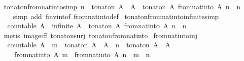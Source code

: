 \begin{isabellebody}
\endisatagproof
{\isafoldproof}%
%
\isadelimproof
\isanewline
%
\endisadelimproof
\isanewline
{}\isamarkupfalse%
\ to{\isacharunderscore}nat{\isacharunderscore}on{\isacharunderscore}from{\isacharunderscore}nat{\isacharunderscore}into{\isacharbrackleft}simp{\isacharbrackright}{\isacharcolon}\ {\isachardoublequoteopen}n\ {\isasymin}\ to{\isacharunderscore}nat{\isacharunderscore}on\ A\ {\isacharbackquote}\ A\ {\isasymLongrightarrow}\ to{\isacharunderscore}nat{\isacharunderscore}on\ A\ {\isacharparenleft}from{\isacharunderscore}nat{\isacharunderscore}into\ A\ n{\isacharparenright}\ {\isacharequal}\ n{\isachardoublequoteclose}\isanewline
%
\isadelimproof
\ \ %
\endisadelimproof
%
\isatagproof
{}\isamarkupfalse%
\ {\isacharparenleft}simp\ add{\isacharcolon}\ f{\isacharunderscore}inv{\isacharunderscore}into{\isacharunderscore}f\ from{\isacharunderscore}nat{\isacharunderscore}into{\isacharunderscore}def{\isacharparenright}%
\endisatagproof
{\isafoldproof}%
%
\isadelimproof
\isanewline
%
\endisadelimproof
\isanewline
{}\isamarkupfalse%
\ to{\isacharunderscore}nat{\isacharunderscore}on{\isacharunderscore}from{\isacharunderscore}nat{\isacharunderscore}into{\isacharunderscore}infinite{\isacharbrackleft}simp{\isacharbrackright}{\isacharcolon}\isanewline
\ \ {\isachardoublequoteopen}countable\ A\ {\isasymLongrightarrow}\ infinite\ A\ {\isasymLongrightarrow}\ to{\isacharunderscore}nat{\isacharunderscore}on\ A\ {\isacharparenleft}from{\isacharunderscore}nat{\isacharunderscore}into\ A\ n{\isacharparenright}\ {\isacharequal}\ n{\isachardoublequoteclose}\isanewline
%
\isadelimproof
\ \ %
\endisadelimproof
%
\isatagproof
{}\isamarkupfalse%
\ {\isacharparenleft}metis\ image{\isacharunderscore}iff\ to{\isacharunderscore}nat{\isacharunderscore}on{\isacharunderscore}surj\ to{\isacharunderscore}nat{\isacharunderscore}on{\isacharunderscore}from{\isacharunderscore}nat{\isacharunderscore}into{\isacharparenright}%
\endisatagproof
{\isafoldproof}%
%
\isadelimproof
\isanewline
%
\endisadelimproof
\isanewline
{}\isamarkupfalse%
\ from{\isacharunderscore}nat{\isacharunderscore}into{\isacharunderscore}inj{\isacharcolon}\isanewline
\ \ {\isachardoublequoteopen}countable\ A\ {\isasymLongrightarrow}\ m\ {\isasymin}\ to{\isacharunderscore}nat{\isacharunderscore}on\ A\ {\isacharbackquote}\ A\ {\isasymLongrightarrow}\ n\ {\isasymin}\ to{\isacharunderscore}nat{\isacharunderscore}on\ A\ {\isacharbackquote}\ A\ {\isasymLongrightarrow}\isanewline
\ \ \ \ from{\isacharunderscore}nat{\isacharunderscore}into\ A\ m\ {\isacharequal}\ from{\isacharunderscore}nat{\isacharunderscore}into\ A\ n\ {\isasymlongleftrightarrow}\ m\ {\isacharequal}\ n{\isachardoublequoteclose}\isanewline

\end{isabellebody}

